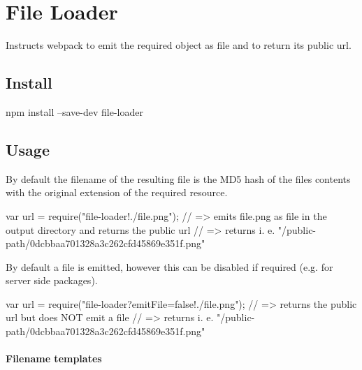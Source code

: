 \href{https://npmjs.com/package/file-loader}{\tt } \href{https://nodejs.org}{\tt } \href{https://david-dm.org/webpack-contrib/file-loader}{\tt } \href{https://travis-ci.org/webpack-contrib/file-loader}{\tt } \href{https://coveralls.io/github/webpack-contrib/file-loader}{\tt } \href{https://gitter.im/webpack/webpack}{\tt }

 \href{https://github.com/webpack/webpack}{\tt } \section*{File Loader}

 

Instructs webpack to emit the required object as file and to return its public url.

 

\subsection*{Install}


\begin{DoxyCode}
npm install --save-dev file-loader
\end{DoxyCode}


\subsection*{Usage}

By default the filename of the resulting file is the M\+D5 hash of the file\textquotesingle{}s contents with the original extension of the required resource.


\begin{DoxyCode}
var url = require("file-loader!./file.png");
// => emits file.png as file in the output directory and returns the public url
// => returns i. e. "/public-path/0dcbbaa701328a3c262cfd45869e351f.png"
\end{DoxyCode}


By default a file is emitted, however this can be disabled if required (e.\+g. for server side packages).


\begin{DoxyCode}
var url = require("file-loader?emitFile=false!./file.png");
// => returns the public url but does NOT emit a file
// => returns i. e. "/public-path/0dcbbaa701328a3c262cfd45869e351f.png"
\end{DoxyCode}


\paragraph*{Filename templates}

